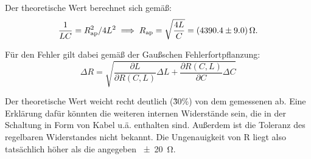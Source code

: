 Der theoretische Wert berechnet sich gemäß:
\begin{equation}
  \frac{1}{LC} = R_\text{ap}^2/4L^2 \\
  \implies R_\text{ap} = \sqrt{\frac{4L}{C}} = \SI{4390.4 \pm 9.0}{\ohm}.
\end{equation}

Für den Fehler gilt dabei gemäß der Gaußschen Fehlerfortpflanzung:
\begin{equation}
  \Delta R = \sqrt{\left.\frac{\partial L}{\partial R(C,L)}\right.\Delta L
  + \left.\frac{\partial R(C,L)}{\partial C}\right. \Delta C}
  \label{eqn:gauss}
\end{equation}

Der theoretische Wert weicht recht deutlich (\~30\%) von dem gemessenen ab.
Eine Erklärung dafür könnten die weiteren internen Widerstände sein, die in
der Schaltung in Form von Kabel u.ä. enthalten sind. Außerdem ist die Toleranz
des regelbaren Widerstandes nicht bekannt. Die Ungenauigkeit von R liegt also
tatsächlich höher als die angegeben \SI{+-20}{\ohm}.

